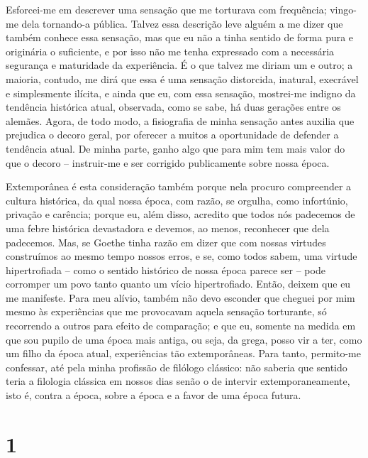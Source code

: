 Esforcei-me em descrever uma sensação que me torturava com frequência;
vingo-me dela tornando-a pública. Talvez essa descrição leve alguém a me
dizer que também conhece essa sensação, mas que eu não a tinha sentido
de forma pura e originária o suficiente, e por isso não me tenha
expressado com a necessária segurança e maturidade da experiência. É o
que talvez me diriam um e outro; a maioria, contudo, me dirá que essa é
uma sensação distorcida, inatural, execrável e simplesmente ilícita, e
ainda que eu, com essa sensação, mostrei-me indigno da tendência
histórica atual, observada, como se sabe, há duas gerações entre os
alemães. Agora, de todo modo, a fisiografia de minha sensação antes
auxilia que prejudica o decoro geral, por oferecer a muitos a
oportunidade de defender a tendência atual. De minha parte, ganho algo
que para mim tem mais valor do que o decoro -- instruir-me e ser
corrigido publicamente sobre nossa época.

Extemporânea é esta consideração também porque nela procuro compreender
a cultura histórica, da qual nossa época, com razão, se orgulha, como
infortúnio, privação e carência; porque eu, além disso, acredito que
todos nós padecemos de uma febre histórica devastadora e devemos, ao
menos, reconhecer que dela padecemos. Mas, se Goethe tinha razão em dizer que
com nossas virtudes construímos ao mesmo tempo nossos erros,
e se, como todos sabem, uma virtude hipertrofiada -- como o sentido histórico
de nossa época parece ser -- pode corromper um povo tanto quanto um
vício hipertrofiado. Então, deixem que eu me manifeste. Para meu alívio,
também não devo esconder que cheguei por mim mesmo às experiências que
me provocavam aquela sensação torturante, só recorrendo a outros para
efeito de comparação; e que eu, somente na medida em que sou pupilo de
uma época mais antiga, ou seja, da grega, posso vir a ter, como um filho
da época atual, experiências tão extemporâneas. Para tanto, permito-me
confessar, até pela minha profissão de filólogo clássico: não saberia
que sentido teria a filologia clássica em nossos dias senão o de
intervir extemporaneamente, isto é, contra a época, sobre a época e a
favor de uma época futura.\label{epocafutura}

\chapter{1}

